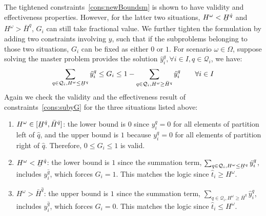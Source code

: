 \documentclass[11pt]{article}
\renewcommand{\underbar}{\underaccent{\bar}}
\begin{document}
	The tightened constraints~\eqref{cons:newBoundsm} is shown to have validity and effectiveness properties. However, for the latter two situations, 
	\(H^\omega < \underbar{H}^{\hat{q}}\) and \(H^\omega > \bar{H}^{\hat{q}}\), 
	\(G_i\) can still take fractional value. We further tighten the formulation by adding two constraints involving \(y\), such that if the subproblems belonging to those two situations, \(G_i\) can be fixed as either \(0\) or \(1\). For scenario \(\omega \in \Omega\), suppose solving the master problem provides the solution \(\hat{y}_i^q, \forall i \in I, q \in \mathcal{Q}_i\), we have:
		\begin{equation}\label{cons:subyG}
			\sum_{q \in \mathcal{Q}_i, H^\omega \leq \underbar{H}^q} \hat{y}_i^q \leq G_i \leq 1 - \sum_{q \in \mathcal{Q}_i, H^\omega \geq \bar{H}^q} \hat{y}_i^q \qquad \forall i \in I 
		\end{equation}
	Again we check the validity and the effectiveness result of constraints~\eqref{cons:subyG} for the three situations listed above:
	\begin{enumerate}
		\item 
			\(H^\omega \in [\underbar{H}^{\hat{q}},\bar{H}^{\hat{q}}]\): 
			the lower bound is \(0\) since \(y_i^q = 0\) for all elements of partition left of \(\hat{q}\), and the upper bound is \(1\) because \(y_i^q = 0\) for all elements of partition right of \(\hat{q}\). Therefore, \(0 \leq G_i \leq 1\) is valid.
		\item 
			\(H^\omega < \underbar{H}^{\hat{q}}\): 
			the lower bound is \(1\) since the summation term, 
			\(\sum_{q \in \mathcal{Q}_i, H^\omega \leq \underbar{H}^q} \hat{y}_i^q\), includes \(y_i^{\hat{q}}\), 
			which forces \(G_i = 1\). This matches the logic since \(\hat{t}_i \geq H^\omega\).
		\item 
			\(H^\omega > \bar{H}^{\hat{q}}\): the upper bound is \(1\) since the summation term, \(\sum_{q \in \mathcal{Q}_i, H^\omega \geq \bar{H}^q} \hat{y}_i^q\), includes \(y_i^{\hat{q}}\), which forces \(G_i = 0\). This matches the logic since \(\hat{t}_i \leq H^\omega\).
	\end{enumerate}
\end{document}
